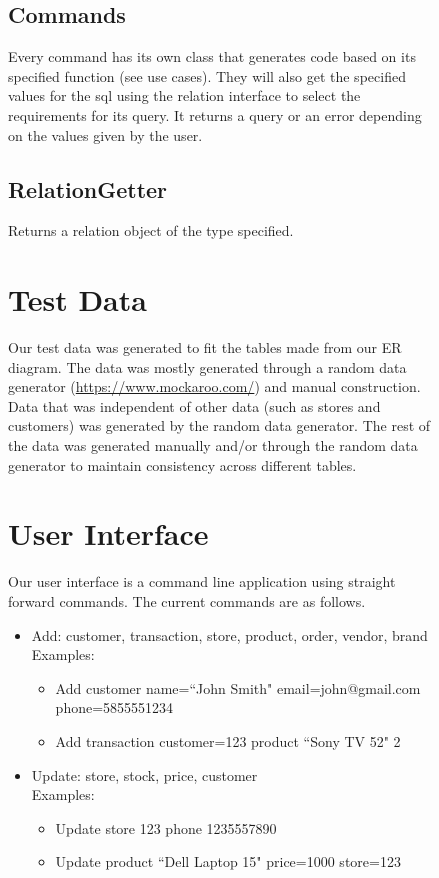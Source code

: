 \documentclass{article}
\begin{document}
\begin{figure}[H]
		\subsection{Commands}
			Every command has its own class that generates code based on its specified function (see use cases). 
			They will also get the specified values for the sql using the relation interface to select the requirements
			for its query. It returns a query or an error depending on the values given by the user.
			
		\subsection{RelationGetter}
			Returns a relation object of the type specified. 


	\section{Test Data}
		Our test data was generated to fit the tables made from our ER diagram. The
		data was mostly generated through a random data generator
		(\url{https://www.mockaroo.com/}) and manual construction. Data that was
		independent of other data (such as stores and customers) was generated by
		the random data generator. The rest of the data was generated manually
		and/or through the random data generator to maintain consistency across
		different tables.

	\section{User Interface}
    Our user interface is a command line application using straight forward
    commands. The current commands are as follows.

    \begin{itemize}
      \item
        Add: customer, transaction, store, product, order, vendor, brand\\
        Examples:
        \begin{itemize}
          \item Add customer name=``John Smith" email=john@gmail.com phone=5855551234
          \item Add transaction customer=123 product ``Sony TV 52" 2
        \end{itemize}

      \item
        Update: store, stock, price, customer\\
        Examples:
        \begin{itemize}
          \item Update store 123 phone 1235557890
          \item Update product ``Dell Laptop 15" price=1000 store=123
        \end{itemize}


\end{itemize}
\end{figure}
\end{document}
